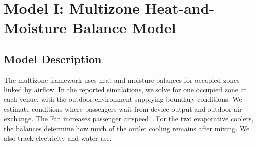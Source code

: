 \section[Model I: Multizone Balance]{Model I: Multizone Heat-and-Moisture Balance Model}
 
\subsection{Model Description}
 
The multizone framework uses heat and moisture balances for occupied zones linked by airflow. In the reported simulations, we solve for one occupied zone at each venue, with the outdoor environment supplying boundary conditions. We estimate conditions where passengers wait from device output and outdoor air exchange. The Fan increases passenger airspeed~\cite{cbe_fans_2023}. For the two evaporative coolers, the balances determine how much of the outlet cooling remains after mixing. We also track electricity and water use.
 

